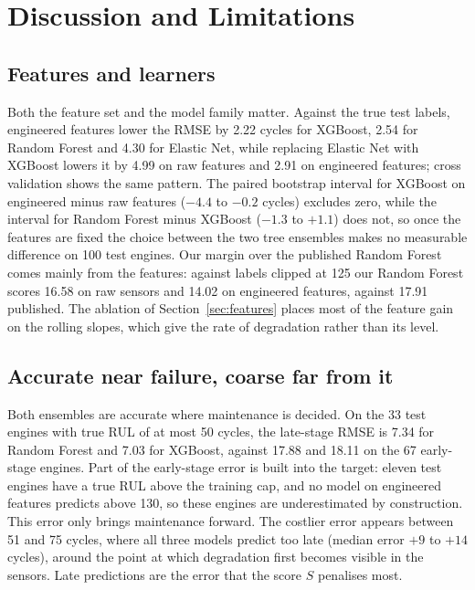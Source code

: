 \section{Discussion and Limitations}
\label{sec:discussion}

\subsection{Features and learners}
Both the feature set and the model family matter. Against the true test
labels, engineered features lower the RMSE by 2.22 cycles for XGBoost,
2.54 for Random Forest and 4.30 for Elastic Net, while replacing Elastic
Net with XGBoost lowers it by 4.99 on raw features and 2.91 on engineered
features; cross validation shows the same pattern. The paired bootstrap
interval for XGBoost on engineered minus raw features ($-4.4$ to $-0.2$
cycles) excludes zero, while the interval for Random Forest minus XGBoost
($-1.3$ to $+1.1$) does not, so once the features are fixed the choice
between the two tree ensembles makes no measurable difference on 100 test
engines. Our margin over the published Random Forest~\cite{zhang2017modbne}
comes mainly from the features: against labels clipped at 125 our Random
Forest scores 16.58 on raw sensors and 14.02 on engineered features,
against 17.91 published. The ablation of
Section~\ref{sec:features} places most of the feature gain on the rolling
slopes, which give the rate of degradation rather than its level.

\subsection{Accurate near failure, coarse far from it}
Both ensembles are accurate where maintenance is decided. On the 33 test
engines with true RUL of at most 50 cycles, the late-stage RMSE is 7.34
for Random Forest and 7.03 for XGBoost, against 17.88 and 18.11 on the 67
early-stage engines. Part of the early-stage error is built into the
target: eleven test engines have a true RUL above the training cap, and
no model on engineered features predicts above 130, so these engines are underestimated by
construction. This error only brings maintenance forward. The costlier
error appears between 51 and 75 cycles, where all three models predict too
late (median error $+9$ to $+14$ cycles), around the point at which
degradation first becomes visible in the sensors. Late predictions are the
error that the score $S$ penalises most.

